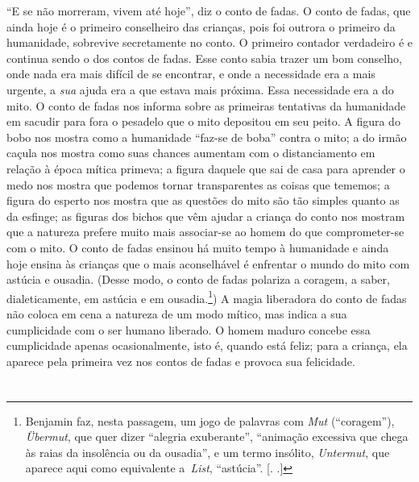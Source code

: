 ``E se não morreram, vivem até hoje'', diz o conto de fadas. O conto de
fadas, que ainda hoje é o primeiro conselheiro das crianças, pois foi
outrora o primeiro da humanidade, sobrevive secretamente no conto. O
primeiro contador verdadeiro é e continua sendo o dos contos de fadas.
Esse conto sabia trazer um bom conselho, onde nada era mais difícil de
se encontrar, e onde a necessidade era a mais urgente, a \emph{sua}
ajuda era a que estava mais próxima. Essa necessidade era a do mito. O
conto de fadas nos informa sobre as primeiras tentativas da humanidade
em sacudir para fora o pesadelo que o mito depositou em seu peito. A
figura do bobo nos mostra como a humanidade ``faz-se de boba'' contra o
mito; a do irmão caçula nos mostra como suas chances aumentam com o
distanciamento em relação à época mítica primeva; a figura daquele que
sai de casa para aprender o medo nos mostra que podemos tornar
transparentes as coisas que tememos; a figura do esperto nos mostra que
as questões do mito são tão simples quanto as da esfinge; as figuras dos
bichos que vêm ajudar a criança do conto nos mostram que a natureza
prefere muito mais associar-se ao homem do que comprometer-se com o
mito. O conto de fadas ensinou há muito tempo à humanidade e ainda hoje
ensina às crianças que o mais aconselhável é enfrentar o mundo do mito
com astúcia e ousadia. (Desse modo, o conto de fadas polariza a coragem,
a saber, dialeticamente, em astúcia e em ousadia.\footnote{Benjamin faz,
  nesta passagem, um jogo de palavras com \emph{Mut} (``coragem''),
  \emph{Übermut}, que quer dizer ``alegria exuberante'', ``animação
  excessiva que chega às raias da insolência ou da ousadia'', e um termo
  insólito, \emph{Untermut}, que aparece aqui como equivalente
  a~\emph{List}, ``astúcia''. [. .]}) A magia liberadora do
conto de fadas não coloca em cena a natureza de um modo mítico, mas
indica a sua cumplicidade com o ser humano liberado\label{supra5}. O homem maduro
concebe essa cumplicidade apenas ocasionalmente, isto é, quando está
feliz; para a criança, ela aparece pela primeira vez nos contos de fadas
e provoca sua felicidade.

\section{}


